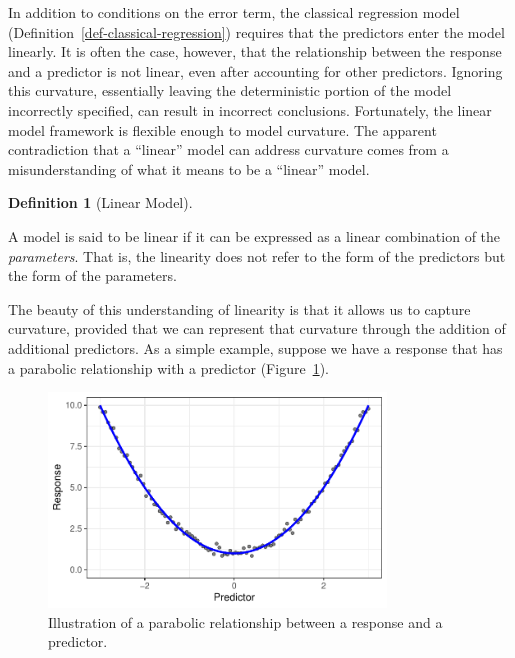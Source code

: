 \documentclass[
  letterpaper,
  DIV=11,
  numbers=noendperiod]{scrreprt}
\theoremstyle{definition}
\theoremstyle{definition}
\newtheorem{definition}{Definition}[chapter]
\theoremstyle{remark}
\begin{document}
\providecommand{\norm}[1]{\lVert#1\rVert}
\providecommand{\abs}[1]{\lvert#1\rvert}
\providecommand{\dist}[1]{\stackrel{\text{#1}}{\sim}}
\providecommand{\ind}[1]{\mathbb{I}\left(#1\right)}
\providecommand{\bm}[1]{\mathbf{#1}}
\providecommand{\bs}[1]{\boldsymbol{#1}}
\providecommand{\Ell}{\mathcal{L}}
\providecommand{\indep}{\perp\negthickspace\negmedspace\perp}

In addition to conditions on the error term, the classical regression
model (Definition~\ref{def-classical-regression}) requires that the
predictors enter the model linearly. It is often the case, however, that
the relationship between the response and a predictor is not linear,
even after accounting for other predictors. Ignoring this curvature,
essentially leaving the deterministic portion of the model incorrectly
specified, can result in incorrect conclusions. Fortunately, the linear
model framework is flexible enough to model curvature. The apparent
contradiction that a ``linear'' model can address curvature comes from a
misunderstanding of what it means to be a ``linear'' model.

\begin{definition}[Linear
Model]\protect\hypertarget{def-linear-model}{}\label{def-linear-model}

A model is said to be linear if it can be expressed as a linear
combination of the \emph{parameters}. That is, the linearity does not
refer to the form of the predictors but the form of the parameters.

\end{definition}

The beauty of this understanding of linearity is that it allows us to
capture curvature, provided that we can represent that curvature through
the addition of additional predictors. As a simple example, suppose we
have a response that has a parabolic relationship with a predictor
(Figure~\ref{fig-modeling-splines-parabola}).

\begin{figure}

{\centering \includegraphics[width=0.8\textwidth,height=\textheight]{./images/fig-modeling-splines-parabola-1.pdf}

}

\caption{\label{fig-modeling-splines-parabola}Illustration of a
parabolic relationship between a response and a predictor.}

\end{figure}
\end{document}
